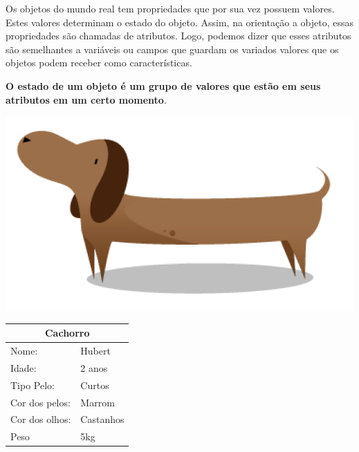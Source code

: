 Os objetos do mundo real tem propriedades que por sua vez possuem valores. 
Estes valores determinam o estado do objeto. Assim, na orientação a objeto, 
essas propriedades são chamadas de atributos. Logo, podemos dizer que esses atributos são semelhantes a variáveis ou campos que guardam os variados valores que os objetos podem receber como características.

\textbf{O estado de um objeto é um grupo de valores que estão em seus atributos em um certo momento}. \\

\begin{minipage}{\textwidth}
  \begin{minipage}[b]{0.49\textwidth}
    \centering
    \includegraphics[scale=0.4]{imagens/cachorro-objeto.png}
    \label{fig:cachorro-objeto-1}
  \end{minipage}
  \hfill
  \begin{minipage}[b]{0.52\textwidth}
    \centering
    \begin{tabular}{|l|l|}
      \hline
      \multicolumn{2}{|c|}{Cachorro}      \\ \hline
        Nome:                 & Hubert    \\ \hline
        Idade:                & 2 anos    \\ \hline
        Tipo Pelo:            & Curtos    \\ \hline
        Cor dos pelos:        & Marrom    \\ \hline
        Cor dos olhos:        & Castanhos \\ \hline
        Peso                  & 5kg       \\ \hline
      \end{tabular}
    \end{minipage}
  \end{minipage} \\

